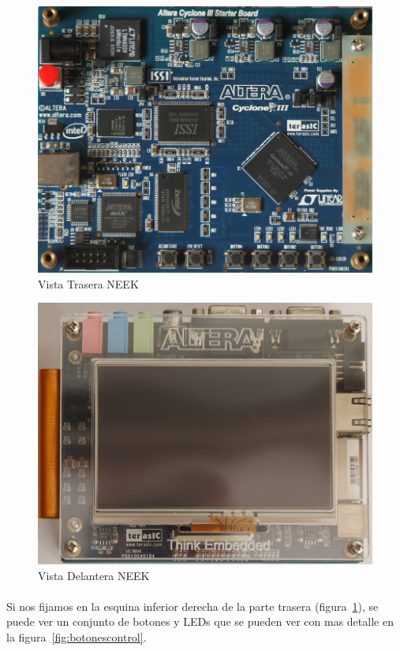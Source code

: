 \documentclass[a4paper,12pt,titlepage,final]{book}
\begin{document}
\begin{figure}[p]
\centering
\includegraphics[width=\textwidth]{./figuras/NEEK/Trasera.png}
\caption{Vista Trasera NEEK}
\label{fig:traseraneek}
\end{figure}

\begin{figure}[p]
\centering
\includegraphics[width=\textwidth]{./figuras/NEEK/Delantera.png}
\caption{Vista Delantera NEEK}
\label{fig:delanteraneek}
\end{figure}

\paragraph{}
Si nos fijamos en la esquina inferior derecha de la parte trasera (figura~\ref{fig:traseraneek}), se puede ver un conjunto de botones y LEDs que se pueden ver con mas detalle en la figura~\ref{fig:botonescontrol}.
\end{document}

